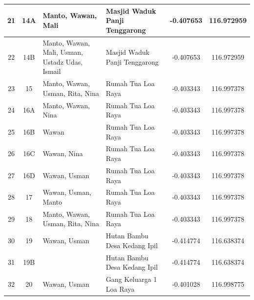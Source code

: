 \begin{landscape}
{\begin{tabularx}{\textwidth}{|c|c|l|l|c|c|}
            21 & 14A            & Manto, Wawan, Mali                                           & Masjid Waduk Panji Tenggarong      & -0.407653         & 116.972959         \\ \hline
            22 & 14B            & Manto, Wawan, Mali, Usman, Ustadz Udas,   Ismail             & Masjid Waduk Panji Tenggarong      & -0.407653         & 116.972959         \\ \hline
            23 & 15             & Manto, Wawan, Usman, Rita, Nina                              & Rumah Tua Loa Raya                 & -0.403343         & 116.997378         \\ \hline
            24 & 16A            & Manto, Wawan, Nina                                           & Rumah Tua Loa Raya                 & -0.403343         & 116.997378         \\ \hline
            25 & 16B            & Wawan                                                        & Rumah Tua Loa Raya                 & -0.403343         & 116.997378         \\ \hline
            26 & 16C            & Wawan, Nina                                                  & Rumah Tua Loa Raya                 & -0.403343         & 116.997378         \\ \hline
            27 & 16D            & Wawan, Usman                                                 & Rumah Tua Loa Raya                 & -0.403343         & 116.997378         \\ \hline
            28 & 17             & Wawan, Usman, Manto                                          & Rumah Tua Loa Raya                 & -0.403343         & 116.997378         \\ \hline
            29 & 18             & Manto, Wawan, Usman, Rita, Nina                              & Rumah Tua Loa Raya                 & -0.403343         & 116.997378         \\ \hline
            30 & 19             & Wawan, Usman                                                 & Hutan Bambu Desa Kedang Ipil       & -0.414774         & 116.638374         \\ \hline
            31 & 19B            &                                                              & Hutan Bambu Desa Kedang Ipil       & -0.414774         & 116.638374         \\ \hline
            32 & 20             & Wawan, Usman                                                 & Gang Keluarga 1 Loa Raya           & -0.401028         & 116.998775         \\ \hline

\end{tabularx}}
\end{landscape}
